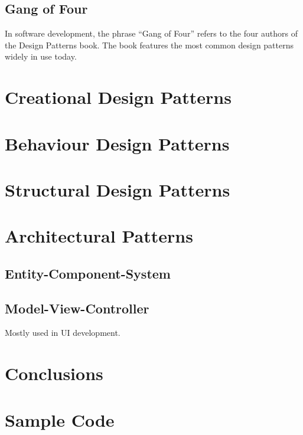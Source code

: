\documentclass[10pt,letterpaper]{article}
\begin{document}
\begin{multicols}{2}
\subsection{Gang of Four}

In software development, the phrase ``Gang of Four'' refers to the four authors of the Design Patterns book. The book features the most common design patterns widely in use today.\\




\section{Creational Design Patterns}

\section{Behaviour Design Patterns}

\section{Structural Design Patterns}

\section{Architectural Patterns}

\subsection{Entity-Component-System}

\subsection{Model-View-Controller}

Mostly used in UI development. 

\section{Conclusions}

\end{multicols}

\clearpage
{}
% 



\clearpage
\appendix
\section{Sample Code}

\end{document}

